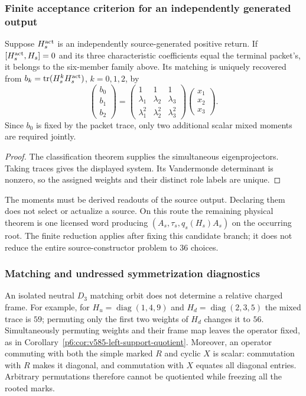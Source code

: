\documentclass[11pt,a4paper]{article}
\begin{document}
\subsubsection{Finite acceptance criterion for an independently generated output}
\begin{corollary}
\label{p6:cor:v585-action-binding-test}
Suppose $H_s^{\rm act}$ is an independently source-generated positive
return. If $[H_s^{\rm act},H_s]=0$ and its three characteristic coefficients
equal the terminal packet's, it belongs to the six-member family above.
Its matching is uniquely recovered from
$b_k=\operatorname{tr}(H_s^kH_s^{\rm act})$, $k=0,1,2$, by
\[
 \begin{pmatrix}b_0\\b_1\\b_2\end{pmatrix}
 =\begin{pmatrix}1&1&1\\\lambda_1&\lambda_2&\lambda_3\\
                 \lambda_1^2&\lambda_2^2&\lambda_3^2\end{pmatrix}
   \begin{pmatrix}x_1\\x_2\\x_3\end{pmatrix}.
\]
Since $b_0$ is fixed by the packet trace, only two additional scalar mixed
moments are required jointly.
\end{corollary}
\begin{proof}
The classification theorem supplies the simultaneous eigenprojectors.
Taking traces gives the displayed system. Its Vandermonde determinant is
nonzero, so the assigned weights and their distinct role labels are unique.
\end{proof}
The moments must be derived readouts of the source output. Declaring them
does not select or actualize a source. On this route the remaining physical
theorem is one licensed word producing $(A_s,\tau_s,q_s(H_s)A_s)$ on the
occurring root. The finite reduction applies after fixing this candidate
branch; it does not reduce the entire source-constructor problem to 36 choices.

\subsubsection{Matching and undressed symmetrization diagnostics}
An isolated neutral $D_3$ matching orbit does not determine a relative
charged frame. For example, for $H_u=\operatorname{diag}(1,4,9)$ and
$H_d=\operatorname{diag}(2,3,5)$ the mixed trace is $59$; permuting only
the first two weights of $H_d$ changes it to $56$. Simultaneously
permuting weights and their frame map leaves the operator fixed, as in
Corollary~\ref{p6:cor:v585-left-support-quotient}. Moreover, an operator
commuting with both the simple marked $R$ and cyclic $X$ is scalar:
commutation with $R$ makes it diagonal, and commutation with $X$ equates
all diagonal entries. Arbitrary permutations therefore cannot be quotiented
while freezing all the rooted marks.
\end{document}
